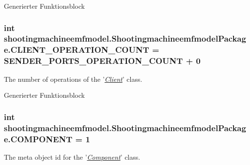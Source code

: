 Generierter Funktionsblock  \hypertarget{interfaceshootingmachineemfmodel_1_1_shootingmachineemfmodel_package_a291c3d883d4c792e13bacc79262dc76e}{
\subsubsection[{C\-L\-I\-E\-N\-T\-\_\-\-O\-P\-E\-R\-A\-T\-I\-O\-N\-\_\-\-C\-O\-U\-N\-T}]{\setlength{\rightskip}{0pt plus 5cm}int shootingmachineemfmodel.\-Shootingmachineemfmodel\-Package.\-C\-L\-I\-E\-N\-T\-\_\-\-O\-P\-E\-R\-A\-T\-I\-O\-N\-\_\-\-C\-O\-U\-N\-T = {\bf S\-E\-N\-D\-E\-R\-\_\-\-P\-O\-R\-T\-S\-\_\-\-O\-P\-E\-R\-A\-T\-I\-O\-N\-\_\-\-C\-O\-U\-N\-T} + 0}}\label{interfaceshootingmachineemfmodel_1_1_shootingmachineemfmodel_package_a291c3d883d4c792e13bacc79262dc76e}
The number of operations of the '{\itshape \hyperlink{interfaceshootingmachineemfmodel_1_1_client}{Client}}' class.

Generierter Funktionsblock  \hypertarget{interfaceshootingmachineemfmodel_1_1_shootingmachineemfmodel_package_aa320a83958a1e101bf5743c8ea4d98c5}{
\subsubsection[{C\-O\-M\-P\-O\-N\-E\-N\-T}]{\setlength{\rightskip}{0pt plus 5cm}int shootingmachineemfmodel.\-Shootingmachineemfmodel\-Package.\-C\-O\-M\-P\-O\-N\-E\-N\-T = 1}}\label{interfaceshootingmachineemfmodel_1_1_shootingmachineemfmodel_package_aa320a83958a1e101bf5743c8ea4d98c5}
The meta object id for the '\hyperlink{classshootingmachineemfmodel_1_1impl_1_1_component_impl}{{\itshape Component}}' class.

